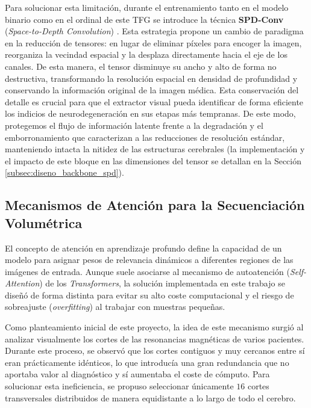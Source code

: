 \documentclass[12pt, oneside, english, spanish]{book}
\begin{document}
Para solucionar esta limitación, durante el entrenamiento tanto en el modelo binario como en el ordinal de este TFG se introduce la técnica \textbf{SPD-Conv} (\textit{Space-to-Depth Convolution}) \cite{sikiric2022no}. Esta estrategia propone un cambio de paradigma en la reducción de tensores: en lugar de eliminar píxeles para encoger la imagen, reorganiza la vecindad espacial y la desplaza directamente hacia el eje de los canales. De esta manera, el tensor disminuye su ancho y alto de forma no destructiva, transformando la resolución espacial en densidad de profundidad y conservando la información original de la imagen médica. Esta conservación del detalle es crucial para que el extractor visual pueda identificar de forma eficiente los indicios de neurodegeneración en sus etapas más tempranas. De este modo, protegemos el flujo de información latente frente a la degradación y el emborronamiento que caracterizan a las reducciones de resolución estándar, manteniendo intacta la nitidez de las estructuras cerebrales (la implementación y el impacto de este bloque en las dimensiones del tensor se detallan en la Sección \ref{subsec:diseno_backbone_spd}).

\subsection{Mecanismos de Atención para la Secuenciación Volumétrica} \label{subsec:atencion_teoria}

El concepto de atención en aprendizaje profundo define la capacidad de un modelo para asignar pesos de relevancia dinámicos a diferentes regiones de las imágenes de entrada. Aunque suele asociarse al mecanismo de autoatención (\textit{Self-Attention}) de los \textit{Transformers}, la solución implementada en este trabajo se diseñó de forma distinta para evitar su alto coste computacional y el riesgo de sobreajuste (\textit{overfitting}) al trabajar con muestras pequeñas.

Como planteamiento inicial de este proyecto, la idea de este mecanismo surgió al analizar visualmente los cortes de las resonancias magnéticas de varios pacientes. Durante este proceso, se observó que los cortes contiguos y muy cercanos entre sí eran prácticamente idénticos, lo que introducía una gran redundancia que no aportaba valor al diagnóstico y sí aumentaba el coste de cómputo. Para solucionar esta ineficiencia, se propuso seleccionar únicamente $16$ cortes transversales distribuidos de manera equidistante a lo largo de todo el cerebro.
\end{document}
